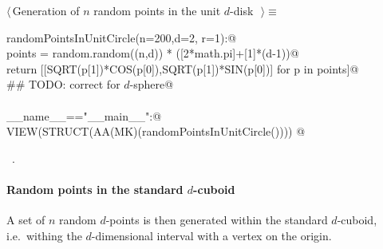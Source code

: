 \documentclass[11pt,oneside]{article}	%
\begin{document}
\begin{flushleft} \small \label{scrap19}
$\langle\,$Generation of $n$ random points in the unit $d$-disk\nobreak\ {\footnotesize {}}$\,\rangle\equiv$
\vspace{-1ex}
\begin{list}{}{} \item
\mbox{}\verb@def randomPointsInUnitCircle(n=200,d=2, r=1):@\\
\mbox{}\verb@   points = random.random((n,d)) * ([2*math.pi]+[1]*(d-1))@\\
\mbox{}\verb@   return [[SQRT(p[1])*COS(p[0]),SQRT(p[1])*SIN(p[0])] for p in points]@\\
\mbox{}\verb@   ## TODO: correct for $d$-sphere@\\
\mbox{}\verb@@\\
\mbox{}\verb@if __name__=="__main__":@\\
\mbox{}\verb@   VIEW(STRUCT(AA(MK)(randomPointsInUnitCircle()))) @\\
\mbox{}\verb@@{\NWsep}
\end{list}
\vspace{-1ex}
\footnotesize\addtolength{\baselineskip}{-1ex}
\begin{list}{}{\setlength{\itemsep}{-\parsep}\setlength{\itemindent}{-\leftmargin}}
\item \NWtxtMacroRefIn\ .
\end{list}
\end{flushleft}

\paragraph{Random points in the standard $d$-cuboid} 
A set of $n$ random $d$-points is then generated within the standard $d$-cuboid, i.e.~withing the $d$-dimensional interval with a vertex on the origin.
\end{document}
